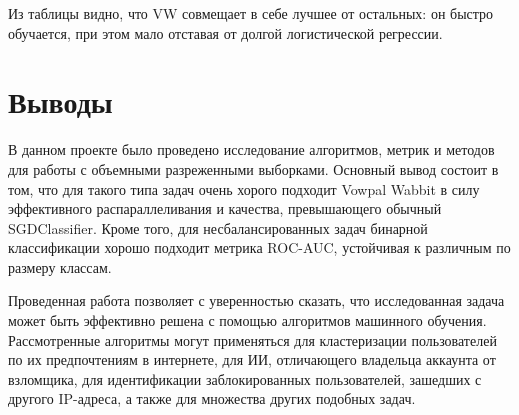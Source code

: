\documentclass[12pt,a4paper]{article}
\theoremstyle{plain}
\theoremstyle{definition}
\theoremstyle{remark}
\renewcommand{\%}[1]{\,\text{mod} \,#1}
\begin{document}
	Из таблицы видно, что VW совмещает в себе лучшее от остальных: он быстро обучается, при этом мало отставая от долгой логистической регрессии.
	\section{Выводы}
	В данном проекте было проведено исследование алгоритмов, метрик и методов для работы с объемными разреженными выборками. Основный вывод состоит в том, что для такого типа задач очень хорого подходит Vowpal Wabbit в силу эффективного распараллеливания и качества, превышающего обычный SGDClassifier. Кроме того, для несбалансированных задач бинарной классификации хорошо подходит метрика ROC-AUC, устойчивая к различным по размеру классам.
	
	Проведенная работа позволяет с уверенностью сказать, что исследованная задача может быть эффективно решена с помощью алгоритмов машинного обучения. Рассмотренные алгоритмы могут применяться для кластеризации пользователей по их предпочтениям в интернете, для ИИ, отличающего владельца аккаунта от взломщика, для идентификации заблокированных пользователей, зашедших с другого IP-адреса, а также для множества других подобных задач. 
\end{document}
